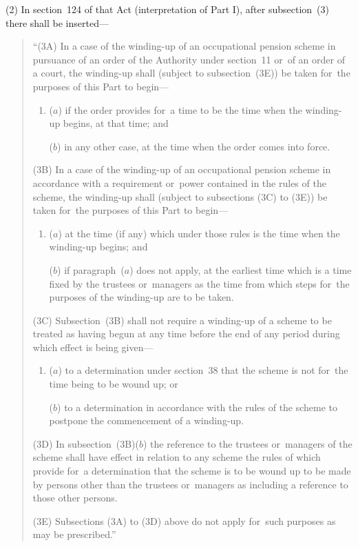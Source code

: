 \documentclass[12pt,a4paper]{article}
\begin{document}
(2) In section~124 of that Act (interpretation of Part I), after subsection~(3)  there shall be inserted—
\begin{quotation}
“(3A) In a case of the winding-up of an occupational pension scheme in pursuance of an order of the Authority under section~11 or~of an order of a court, the winding-up shall (subject to subsection~(3E)) be taken for~the purposes of this Part to begin—
\begin{enumerate}\item[]
($a$) if the order provides for~a time to be the time when the winding-up begins, at that time; and

($b$) in any other case, at the time when the order comes into force.
\end{enumerate}

(3B) In a case of the winding-up of an occupational pension scheme in accordance with a requirement or~power contained in the rules of the scheme, the winding-up shall (subject to subsections (3C)  to (3E)) be taken for~the purposes of this Part to begin—
\begin{enumerate}\item[]
($a$) at the time (if any) which under those rules is the time when the winding-up begins; and

($b$) if paragraph~($a$)  does not apply, at the earliest time which is a time fixed by the trustees or~managers as the time from which steps for~the purposes of the winding-up are to be taken.
\end{enumerate}

(3C) Subsection~(3B)  shall not require a winding-up of a scheme to be treated as having begun at any time before the end of any period during which effect is being given—
\begin{enumerate}\item[]
($a$) to a determination under section~38 that the scheme is not for~the time being to be wound up; or

($b$) to a determination in accordance with the rules of the scheme to postpone the commencement of a winding-up.
\end{enumerate}

(3D) In subsection~(3B)($b$)  the reference to the trustees or~managers of the scheme shall have effect in relation to any scheme the rules of which provide for~a determination that the scheme is to be wound up to be made by persons other than the trustees or~managers as including a reference to those other persons.

(3E) Subsections (3A)  to (3D)  above do not apply for~such purposes as may be prescribed.”
\end{quotation}
\end{document}
